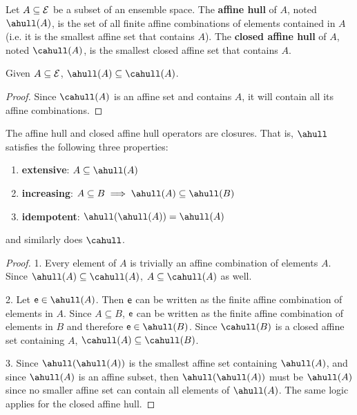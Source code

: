 \begin{mathSection}
\begin{defn}
	Let $A \subseteq \Ens$ be a subset of an ensemble space. The \textbf{affine hull} of $A$, noted $\ahull(A)$, is the set of all finite affine combinations of elements contained in $A$ (i.e. it is the smallest affine set that contains $A$). The \textbf{closed affine hull} of $A$, noted $\cahull(A)$, is the smallest closed affine set that contains $A$. 
\end{defn}

\begin{coro}
	Given $A \subseteq \Ens$, $\ahull(A) \subseteq \cahull(A)$.
\end{coro}

\begin{proof}
	Since $\cahull(A)$ is an affine set and contains $A$, it will contain all its affine combinations.
\end{proof}

\begin{prop}
	The affine hull and closed affine hull operators are closures. That is, $\ahull$ satisfies the following three properties:
	\begin{enumerate}
		\item \textbf{extensive}: $A \subseteq \ahull(A)$
		\item  \textbf{increasing}: $A \subseteq B \implies \ahull(A) \subseteq \ahull(B)$
		\item \textbf{idempotent}: $\ahull(\ahull(A)) = \ahull(A)$
	\end{enumerate}
	and similarly does $\cahull$.
\end{prop}

\begin{proof}
	1. Every element of $A$ is trivially an affine combination of elements $A$. Since $\ahull(A) \subseteq \cahull(A)$, $A \subseteq \cahull(A)$ as well.
	
	2. Let $\ens[e] \in \ahull(A)$. Then $\ens[e]$ can be written as the finite affine combination of elements in $A$. Since $A \subseteq B$, $\ens[e]$ can be written as the finite affine combination of elements in $B$ and therefore $\ens[e] \in \ahull(B)$. Since $\cahull(B)$ is a closed affine set containing $A$, $\cahull(A) \subseteq \cahull(B)$.
	
	3. Since $\ahull(\ahull(A))$ is the smallest affine set containing $\ahull(A)$, and since $\ahull(A)$ is an affine subset, then $\ahull(\ahull(A))$ must be $\ahull(A)$ since no smaller affine set can contain all elements of $\ahull(A)$. The same logic applies for the closed affine hull.
\end{proof}


\end{mathSection}
